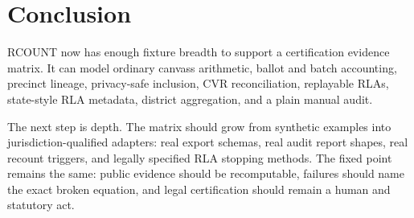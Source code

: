 \section{Conclusion}

RCOUNT now has enough fixture breadth to support a certification evidence
matrix. It can model ordinary canvass arithmetic, ballot and batch accounting,
precinct lineage, privacy-safe inclusion, CVR reconciliation, replayable RLAs,
state-style RLA metadata, district aggregation, and a plain manual audit.

The next step is depth. The matrix should grow from synthetic examples into
jurisdiction-qualified adapters: real export schemas, real audit report shapes,
real recount triggers, and legally specified RLA stopping methods. The fixed
point remains the same: public evidence should be recomputable, failures should
name the exact broken equation, and legal certification should remain a human
and statutory act.
